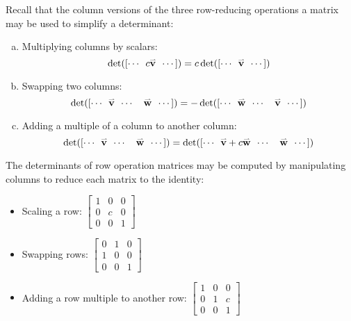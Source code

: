 \begin{remark}
  Recall that the column versions of the three row-reducing operations
  a matrix may be used to simplify a determinant:
  \begin{enumerate}[(a)]
  \item Multiplying columns by scalars:
        \[\det([\cdots\hspace{0.5em}c\vec{v}\hspace{0.5em} \cdots])=
        c\det([\cdots\hspace{0.5em}\vec{v}\hspace{0.5em} \cdots])\]
  \item Swapping two columns:
        \[\det([\cdots\hspace{0.5em}\vec{v}\hspace{0.5em}
        \cdots\hspace{1em}\vec{w}\hspace{0.5em} \cdots])=
        -\det([\cdots\hspace{0.5em}\vec{w}\hspace{0.5em}
        \cdots\hspace{1em}\vec{v}\hspace{0.5em} \cdots])\]
  \item Adding a multiple of a column to another column:
        \[\det([\cdots\hspace{0.5em}\vec{v}\hspace{0.5em}
        \cdots\hspace{1em}\vec{w}\hspace{0.5em} \cdots])=
        \det([\cdots\hspace{0.5em}\vec{v}+c\vec{w}\hspace{0.5em}
        \cdots\hspace{1em}\vec{w}\hspace{0.5em} \cdots])\]
  \end{enumerate}
\end{remark}
\begin{remark}
The determinants of row operation matrices may be computed
by manipulating columns to reduce each matrix to the identity:
\begin{itemize}
\item Scaling a row: \(  
  \begin{bmatrix}
  1 & 0 & 0 \\
  0 & c & 0 \\
  0 & 0 & 1
  \end{bmatrix}
\)
\item Swapping rows: \(
  \begin{bmatrix}
  0 & 1 & 0 \\
  1 & 0 & 0 \\
  0 & 0 & 1
  \end{bmatrix}
\)
\item Adding a row multiple to another row: \(
  \begin{bmatrix}
  1 & 0 & 0 \\
  0 & 1 & c \\
  0 & 0 & 1
  \end{bmatrix}
\)
\end{itemize}
\end{remark}
